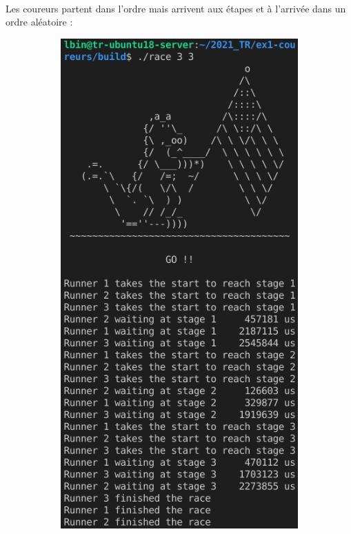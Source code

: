 \documentclass{article}
\begin{document}
    \paragraph{}
    Les coureurs partent dans l'ordre mais arrivent aux étapes et à l'arrivée dans un ordre aléatoire :
    \begin{figure}[H]
        \centering
        \begin{subfigure}[b]{.48\textwidth}
            \centering
            \includegraphics[width=.9\textwidth]{./screenshots/race331.png}

\end{subfigure}
\end{figure}
\end{document}
